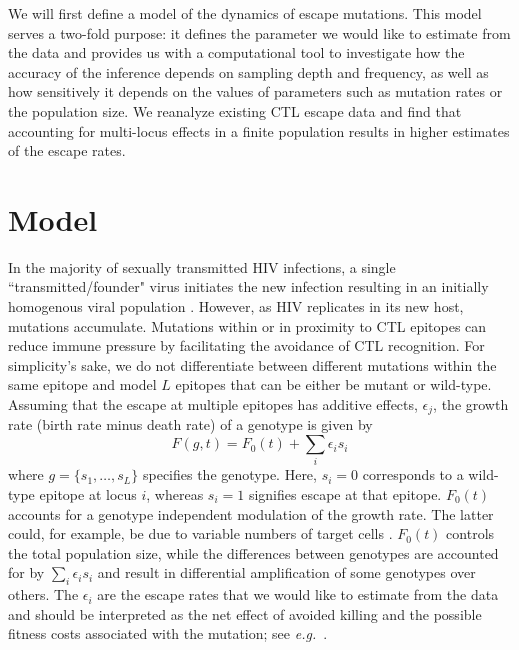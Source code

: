 \documentclass{frontiers}
\newcommand{\gt}{g}
\newcommand{\fcoeff}{\epsilon}
\newcommand{\locus}{s}
\begin{document}
We will first define a model of the dynamics of escape mutations. This model
serves a two-fold purpose: it defines the parameter we would like to
estimate from the data and provides us with a computational tool to
investigate how the accuracy of the inference depends on sampling depth and
frequency, as well as how sensitively it depends on the values of parameters
such as mutation rates or the population size. We reanalyze existing CTL
escape data and find that accounting for multi-locus effects in a finite population
results in higher estimates of the escape rates.

\section{Model} In the majority of sexually transmitted HIV infections, a single 
``transmitted/founder" virus initiates the new infection
resulting in an initially homogenous viral population 
\citep{keele_identification_2008,SalazarGonzalez:2009p35091}.
However, as HIV replicates in its new host, mutations
accumulate. Mutations within or in proximity to CTL epitopes can reduce 
immune pressure by facilitating the avoidance of CTL recognition. 
For simplicity's sake, we do not differentiate between different mutations
within the same epitope and model $L$ epitopes that can be either be
mutant or wild-type.
Assuming that the escape at multiple epitopes has additive effects,
$\fcoeff_j$, the growth rate (birth rate minus death rate) of a genotype is given by
\begin{equation}
\label{eq:growth_rate}
F(\gt,t) = F_0(t) + \sum_i \fcoeff_i \locus_i
\end{equation}
where $\gt = \{\locus_1, \ldots, \locus_L\}$ specifies
the genotype. Here, $\locus_i=0$ corresponds to a wild-type epitope at locus $i$, 
whereas $\locus_i=1$ signifies escape at that epitope. $F_0(t)$ accounts
for a genotype independent modulation of 
the growth rate. The latter could, for example, be due to variable numbers of
target cells \citep{petravic_cd4+_2008}. $F_0(t)$ controls the total population size, while the differences
between genotypes are accounted for by $\sum_i \fcoeff_i \locus_i$ and result in
differential amplification of some genotypes over others. The
$\fcoeff_i$ are the escape rates that we would like to estimate from the data and should
be interpreted as the net effect of avoided killing and the possible fitness costs associated
with the mutation; see \textit{e.g.}~\citet{ganusov_mathematical_2013}.
\end{document}
